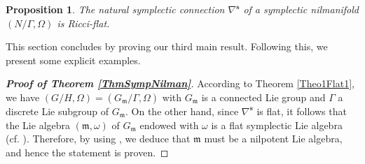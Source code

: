 \documentclass[preprint,12pt,1p]{elsarticle}
\theoremstyle{plain}
\newtheorem{proposition}[theorem]{Proposition}
\theoremstyle{definition}
\newcommand{\n}{\nabla}
\newcommand{\ns}{\n^\mathbf{s}}
\newcommand{\w}{\omega}
\newcommand{\m}{\mathfrak{m}}
\numberwithin{equation}{section}
\begin{document}
\begin{proposition}\label{NilRicFlt}
The natural symplectic connection $\ns$ of a symplectic nilmanifold $(N/\Gamma,\Omega)$ is Ricci-flat.
\end{proposition}

This section concludes by proving our third main result. Following this, we present some explicit examples.

\begin{proof}[\textnormal{\textbf{Proof of Theorem \ref{ThmSympNilman}}}]
According to Theorem \ref{Theo1Flat1}, we have $(G/H,\Omega)=(G_\m/\Gamma,\Omega)$ with $G_\m$ is a connected Lie group and $\Gamma$ a discrete Lie subgroup of $G_\m$. On the other hand, since $\n^\mathbf{s}$ is flat, it follows that the Lie algebra $(\m,\w)$ of $G_\m$ endowed with $\w$ is a flat symplectic Lie algebra (cf. \cite{Oili}). Therefore, by using \cite[p. $4390$]{Oili}, we deduce that $\m$ must be a nilpotent Lie algebra, and hence the statement is proven.
\end{proof}
\end{document}
